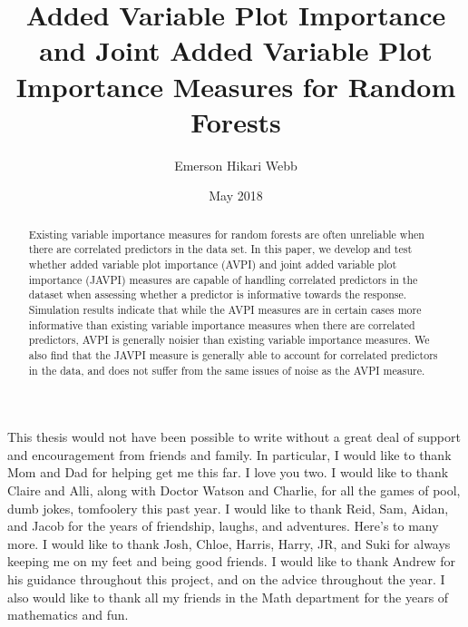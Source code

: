 \documentclass[12pt,twoside]{reedthesis}
\title{Added Variable Plot Importance and Joint Added Variable Plot Importance
Measures for Random Forests}
\author{Emerson Hikari Webb}
\date{May 2018}
\theoremstyle{definition}
\theoremstyle{definition}
\theoremstyle{definition}
\theoremstyle{remark}
\begin{document}
  \maketitle

\frontmatter %
\pagestyle{empty} %
  \begin{acknowledgements}
    This thesis would not have been possible to write without a great deal
    of support and encouragement from friends and family. In particular, I
    would like to thank Mom and Dad for helping get me this far. I love you
    two. I would like to thank Claire and Alli, along with Doctor Watson and
    Charlie, for all the games of pool, dumb jokes, tomfoolery this past
    year. I would like to thank Reid, Sam, Aidan, and Jacob for the years of
    friendship, laughs, and adventures. Here's to many more. I would like to
    thank Josh, Chloe, Harris, Harry, JR, and Suki for always keeping me on
    my feet and being good friends. I would like to thank Andrew for his
    guidance throughout this project, and on the advice throughout the year.
    I also would like to thank all my friends in the Math department for the
    years of mathematics and fun.
  \end{acknowledgements}

  \hypersetup{linkcolor=black}
  \setcounter{tocdepth}{2}
  \tableofcontents

  \listoftables

  \listoffigures
  \begin{abstract}
    Existing variable importance measures for random forests are often
    unreliable when there are correlated predictors in the data set. In this
    paper, we develop and test whether added variable plot importance (AVPI)
    and joint added variable plot importance (JAVPI) measures are capable of
    handling correlated predictors in the dataset when assessing whether a
    predictor is informative towards the response. Simulation results
    indicate that while the AVPI measures are in certain cases more
    informative than existing variable importance measures when there are
    correlated predictors, AVPI is generally noisier than existing variable
    importance measures. We also find that the JAVPI measure is generally
    able to account for correlated predictors in the data, and does not
    suffer from the same issues of noise as the AVPI measure. \par
  \end{abstract}
\end{document}
